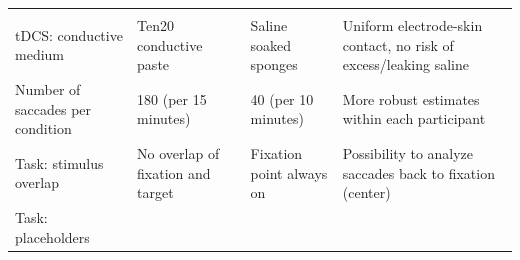 \documentclass[11pt,]{memoir}
\begin{document}
\begin{longtable}[]{@{}llll@{}}
\begin{minipage}[t]{0.38\columnwidth}
\end{minipage}\tabularnewline
\begin{minipage}[t]{0.14\columnwidth}\raggedright
tDCS: conductive medium\strut
\end{minipage} & \begin{minipage}[t]{0.21\columnwidth}\raggedright
Ten20 conductive paste\strut
\end{minipage} & \begin{minipage}[t]{0.16\columnwidth}\raggedright
Saline soaked sponges\strut
\end{minipage} & \begin{minipage}[t]{0.38\columnwidth}\raggedright
Uniform electrode-skin contact, no risk of excess/leaking saline\strut
\end{minipage}\tabularnewline
\begin{minipage}[t]{0.14\columnwidth}\raggedright
Number of saccades per condition\strut
\end{minipage} & \begin{minipage}[t]{0.21\columnwidth}\raggedright
180 (per 15 minutes)\strut
\end{minipage} & \begin{minipage}[t]{0.16\columnwidth}\raggedright
40 (per 10 minutes)\strut
\end{minipage} & \begin{minipage}[t]{0.38\columnwidth}\raggedright
More robust estimates within each participant\strut
\end{minipage}\tabularnewline
\begin{minipage}[t]{0.14\columnwidth}\raggedright
Task: stimulus overlap\strut
\end{minipage} & \begin{minipage}[t]{0.21\columnwidth}\raggedright
No overlap of fixation and target\strut
\end{minipage} & \begin{minipage}[t]{0.16\columnwidth}\raggedright
Fixation point always on\strut
\end{minipage} & \begin{minipage}[t]{0.38\columnwidth}\raggedright
Possibility to analyze saccades back to fixation (center)\strut
\end{minipage}\tabularnewline
\begin{minipage}[t]{0.14\columnwidth}\raggedright
Task: placeholders\strut
\end{minipage} & \begin{minipage}[t]{0.21\columnwidth}\raggedright

\end{minipage}
\end{longtable}
\end{document}
